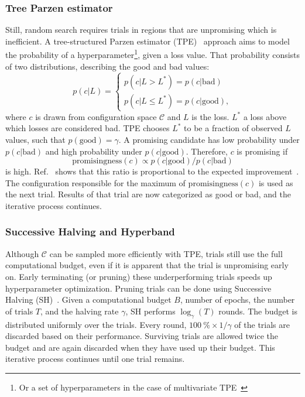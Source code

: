 \subsubsection{Tree Parzen estimator}
Still, random search requires trials in regions that are unpromising which is inefficient.
A tree-structured Parzen estimator (TPE)~\cite{Bergstra2011} approach aims to model the probability of a hyperparameter\footnote{Or a set of hyperparameters in the case of multivariate TPE~\cite{Falkner2018}}, given a loss value.
That probability consists of two distributions, describing the good and bad values:
\begin{equation}
    p(c|L) =
    \begin{cases}
        p(c|L > L^*) = p(c|\mathrm{bad}) \\
        p(c|L \leq L^*) = p(c|\mathrm{good}),
    \end{cases}
\end{equation}
where $c$ is drawn from configuration space $\mathcal{C}$ and $L$ is the loss.
$L^*$ a loss above which losses are considered bad.
TPE chooses $L^*$ to be a fraction of observed $L$ values, such that $p(\mathrm{good}) = \gamma$.
A promising candidate has low probability under $p(c|\mathrm{bad})$ and high probability under $p(c|\mathrm{good})$.
Therefore, $c$ is promising if
\begin{equation}
    \mathrm{promisingness}(c) \propto p(c|\mathrm{good}) / p(c|\mathrm{bad})
\end{equation}
is high.
Ref.~\cite{Bergstra2011} shows that this ratio is proportional to the expected improvement~\cite{Jones2001}.
The configuration responsible for the maximum of $\mathrm{promisingness}(c)$ is used as the next trial.
Results of that trial are now categorized as good or bad, and the iterative process continues.

\subsubsection{Successive Halving and Hyperband}
Although $\mathcal{C}$ can be sampled more efficiently with TPE, trials still use the full computational budget, even if it is apparent that the trial is unpromising early on.
Early terminating (or pruning) these underperforming trials speeds up hyperparameter optimization.
Pruning trials can be done using Successive Halving (SH)~\cite{Jamieson2016}.
Given a computational budget $B$, \eg number of epochs, the number of trials $T$, and the halving rate $\gamma$, SH performs $\log_\gamma(T)$ rounds.
The budget is distributed uniformly over the trials.
Every round, $\qty{100}{\percent} \times 1/\gamma$ of the trials are discarded based on their performance.
Surviving trials are allowed twice the budget and are again discarded when they have used up their budget.
This iterative process continues until one trial remains.

